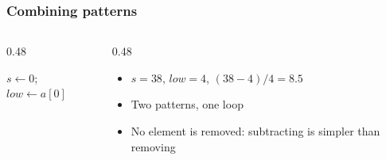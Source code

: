\documentclass[aspectratio=169,10pt,compress]{beamer}
\begin{document}
\begin{frame}[t,fragile] \frametitle{Combining patterns}

	\begin{columns}[T]
		\begin{column}{0.48\textwidth}
			\SetAlFnt{\small}


\begin{algorithm}[H]
				\caption{DropLowest($a$), $n \ge 2$}
				$s \gets 0$; \quad $\mathit{low} \gets a[0]$\;
				\;
\end{algorithm}

		\end{column}
		\begin{column}{0.48\textwidth}
			\begin{center}
			\end{center}
			\begin{itemize}\small
				\item $s = 38$, $\mathit{low} = 4$, $(38 - 4) / 4 = 8.5$
				\item Two patterns, one loop
				\item No element is removed: subtracting is simpler than removing
			\end{itemize}
		\end{column}
	\end{columns}
\end{frame}




\end{document}
